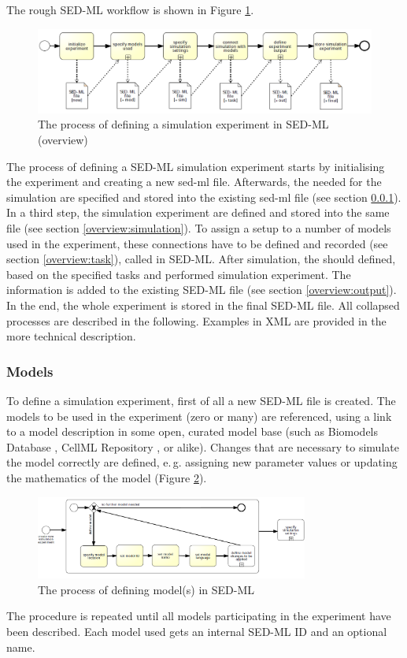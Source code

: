 %
The rough SED-ML workflow is shown in Figure \ref{fig:sedmlWorkflow}.
%
\begin{figure}[h]
\centering
\includegraphics[width=\textwidth]{images/bpmn/sedMainOryx.png}
\caption{The process of defining a simulation experiment in SED-ML (overview)}
\label{fig:sedmlWorkflow}
\end{figure}
%
The process of defining a SED-ML simulation experiment starts by initialising the experiment and creating a new sed-ml file. Afterwards, the  needed for the simulation are specified and stored into the existing sed-ml file (see section \ref{overview:models}). In a third step, the simulation experiment  are defined and stored into the same file (see section \ref{overview:simulation}). To assign a setup to a number of models used in the experiment, these connections have to be defined and recorded (see section \ref{overview:task}), called  in SED-ML. After simulation, the  should defined, based on the specified tasks and performed simulation experiment. The information is added to the existing SED-ML file (see section \ref{overview:output}). In the end, the whole experiment is stored in the final SED-ML file.
%
All collapsed processes are described in the following. Examples in XML are provided in the more technical description.

\subsubsection{Models}
\label{overview:models}
To define a simulation experiment, first of all a new SED-ML file is created. The models to be used in the experiment (zero or many) are referenced, using a link to a model description in some open, curated model base (such as Biomodels Database \cite{LDR+10}, CellML Repository \cite{BBC+09}, or alike). Changes that are necessary to simulate the model correctly are defined, e.\,g. assigning new parameter values or updating the mathematics of the model (Figure \ref{fig:workflowModel}).
%
\begin{figure}[h]
\centering
\includegraphics[width=0.8\textwidth]{images/bpmn/sedModelOryx.png}
\caption{The process of defining model(s) in SED-ML}
\label{fig:workflowModel}
\end{figure}
%
The procedure is repeated until all models participating in the experiment have been described. Each model used gets an internal SED-ML ID and an optional name.

